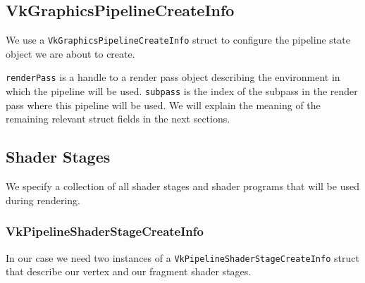 \subsection{VkGraphicsPipelineCreateInfo}

We use a \texttt{VkGraphicsPipelineCreateInfo} struct to configure the pipeline state
object we are about to create.

\begin{minipage}{\linewidth}{\noindent}
    
\end{minipage}

\texttt{renderPass} is a handle to a render pass object describing the environment
in which the pipeline will be used.
\texttt{subpass} is the index of the subpass in the render pass where
this pipeline will be used.
We will explain the meaning of the remaining relevant struct fields
in the next sections.

\subsection{Shader Stages}

We specify a collection of all shader stages and shader programs that
will be used during rendering.

\begin{minipage}{\linewidth}{\noindent}
    
\end{minipage}

\subsubsection{VkPipelineShaderStageCreateInfo}

In our case we need two instances of a \texttt{VkPipelineShaderStageCreateInfo}
struct that describe our vertex and our fragment shader stages.

\begin{minipage}{\linewidth}{\noindent}
    
\end{minipage}

